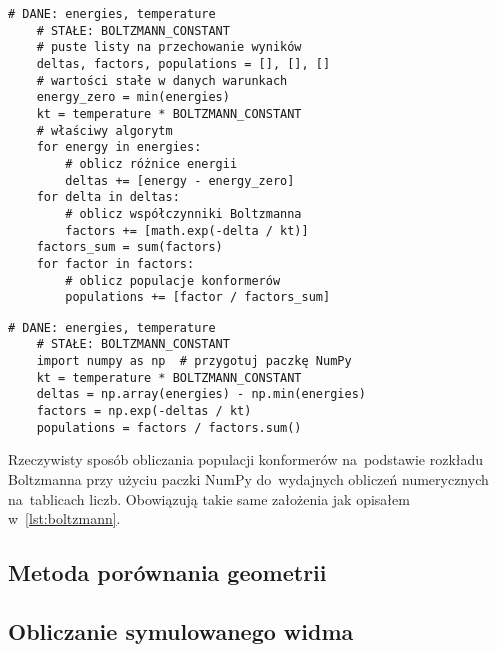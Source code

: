 \begin{listing}
  \begin{lstlisting}[emph={energies, temperature, BOLTZMANN_CONSTANT}]
    # DANE: energies, temperature
    # STAŁE: BOLTZMANN_CONSTANT
    # puste listy na przechowanie wyników
    deltas, factors, populations = [], [], []
    # wartości stałe w danych warunkach
    energy_zero = min(energies)
    kt = temperature * BOLTZMANN_CONSTANT
    # właściwy algorytm
    for energy in energies:
        # oblicz różnice energii
        deltas += [energy - energy_zero]
    for delta in deltas:
        # oblicz współczynniki Boltzmanna
        factors += [math.exp(-delta / kt)]
    factors_sum = sum(factors)
    for factor in factors:
        # oblicz populacje konformerów
        populations += [factor / factors_sum]
  \end{lstlisting}
  \caption{
    Algorytm obliczania populacji konformerów na~podstawie rozkładu Boltzmanna.
    Po~jego wykonaniu, zmienna \lstinline|populations| zawiera listę ułamkowych wartości populacji
      każdego z~konformerów wziętych pod uwagę, sumujących się do~jedności.
    Algorytm zakłada, że dostarczona zostanie lista wartości energii tych konformerów jako
      zmienna \lstinline|energies| oraz temperatura układu jako zmienna \lstinline|temperature|.
    Zakłada także, że znana wartość stałej Boltzmanna przechowywana jest w~zmiennej
      \lstinline|BOLTZMANN_CONSTANT|.
    Wyrażenie \lstinline|lista += [wartość]| oznacza dodanie danej wartości na~koniec listy.
  }\label{lst:boltzmann}
\end{listing}

\begin{listing}
  \begin{lstlisting}[emph={energies, temperature, BOLTZMANN_CONSTANT}]
    # DANE: energies, temperature
    # STAŁE: BOLTZMANN_CONSTANT
    import numpy as np  # przygotuj paczkę NumPy
    kt = temperature * BOLTZMANN_CONSTANT
    deltas = np.array(energies) - np.min(energies)
    factors = np.exp(-deltas / kt)
    populations = factors / factors.sum()
  \end{lstlisting}
  \caption{
    Rzeczywisty sposób obliczania populacji konformerów na~podstawie rozkładu Boltzmanna
      przy użyciu paczki NumPy do~wydajnych obliczeń numerycznych na~tablicach liczb.
    Obowiązują takie same założenia jak opisałem w~\protect\cref{lst:boltzmann}.
  }\label{lst:boltzmann-numpy}
\end{listing}

\subsection{Metoda porównania geometrii}\label{implementation:rmsd}
\subsection{Obliczanie symulowanego widma}\label{implementation:spectra}
